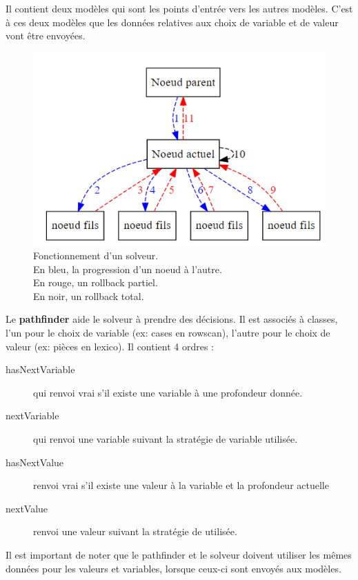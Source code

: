 Il contient deux modèles qui sont les points d'entrée vers les autres modèles. C'est à ces deux modèles que les données relatives aux choix de variable et de valeur vont être envoyées.

\begin{figure}[H]
\centering
\includegraphics[width=\linewidth]{images/parcours_noeuds}
\caption[Fonctionnement d'un solveur]{Fonctionnement d'un solveur.\\	
	 En bleu, la progression d'un noeud à l'autre.\\ En rouge, un rollback partiel. \\ En noir, un rollback total.\\}
\label{fig:parcoursnoeuds}
\end{figure}

Le \textbf{pathfinder} aide le solveur à prendre des décisions. Il est associés à classes, l'un pour le choix de variable (ex: cases en rowscan), l'autre pour le choix de valeur (ex: pièces en lexico). Il contient 4 ordres :
\begin{description}
	\item [hasNextVariable] qui renvoi vrai s'il existe une variable à une profondeur donnée.
	\item [nextVariable] qui renvoi une variable suivant la stratégie de variable utilisée.
	\item[hasNextValue] renvoi vrai s'il existe une valeur à la variable et la profondeur actuelle
	\item[nextValue] renvoi une valeur suivant la stratégie de utilisée.
\end{description}

Il est important de noter que le pathfinder et le solveur doivent utiliser les mêmes données pour les valeurs et variables, lorsque ceux-ci sont envoyés aux modèles.

